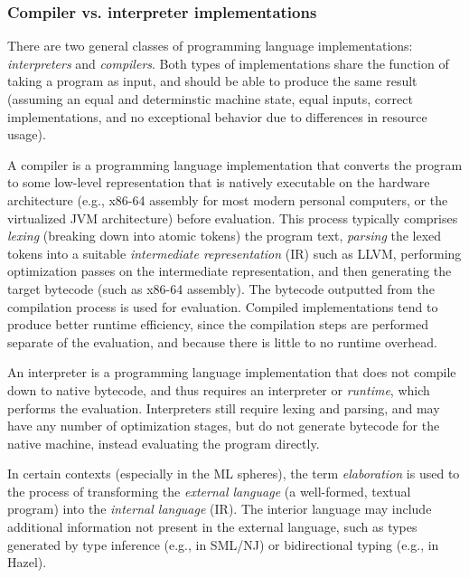 \subsubsection{Compiler vs. interpreter implementations}
\label{sec:comp_vs_interp}


There are two general classes of programming language implementations: \textit{interpreters} and \textit{compilers}. Both types of implementations share the function of taking a program as input, and should be able to produce the same result (assuming an equal and determinstic machine state, equal inputs, correct implementations, and no exceptional behavior due to differences in resource usage).

A compiler is a programming language implementation that converts the program to some low-level representation that is natively executable on the hardware architecture (e.g., x86-64 assembly for most modern personal computers, or the virtualized JVM architecture) before evaluation. This process typically comprises \textit{lexing} (breaking down into atomic tokens) the program text, \textit{parsing} the lexed tokens into a suitable \textit{intermediate representation} (IR) such as LLVM, performing optimization passes on the intermediate representation, and then generating the target bytecode (such as x86-64 assembly). The bytecode outputted from the compilation process is used for evaluation. Compiled implementations tend to produce better runtime efficiency, since the compilation steps are performed separate of the evaluation, and because there is little to no runtime overhead.

An interpreter is a programming language implementation that does not compile down to native bytecode, and thus requires an interpreter or \textit{runtime}, which performs the evaluation. Interpreters still require lexing and parsing, and may have any number of optimization stages, but do not generate bytecode for the native machine, instead evaluating the program directly.


In certain contexts (especially in the ML spheres), the term \textit{elaboration} is used to the process of transforming the \textit{external language} (a well-formed, textual program) into the \textit{internal language} (IR). The interior language may include additional information not present in the external language, such as types generated by type inference (e.g., in SML/NJ) or bidirectional typing (e.g., in Hazel).

